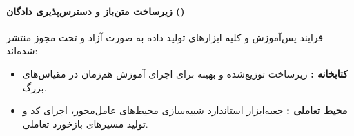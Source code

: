 \paragraph*{زیرساخت متن‌باز و دسترس‌پذیری دادگان ()}
فرایند پس‌آموزش و کلیه ابزارهای تولید داده به صورت آزاد و تحت مجوز  منتشر شده‌اند:
\begin{itemize}
    \item \textbf{کتابخانه :} زیرساخت توزیع‌شده و بهینه برای اجرای آموزش هم‌زمان  در مقیاس‌های بزرگ.
    \item \textbf{محیط تعاملی :} جعبه‌ابزار استاندارد شبیه‌سازی محیط‌های عامل‌محور، اجرای کد و تولید مسیرهای بازخورد تعاملی.
\end{itemize}